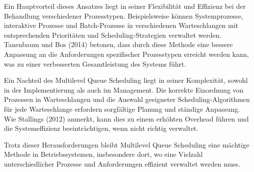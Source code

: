 Ein Hauptvorteil dieses Ansatzes liegt in seiner Flexibilität und Effizienz bei der Behandlung verschiedener Prozesstypen. Beispielsweise können Systemprozesse, interaktive Prozesse und Batch-Prozesse in verschiedenen Warteschlangen mit entsprechenden Prioritäten und Scheduling-Strategien verwaltet werden. Tanenbaum und Bos (2014) betonen, dass durch diese Methode eine bessere Anpassung an die Anforderungen spezifischer Prozesstypen erreicht werden kann, was zu einer verbesserten Gesamtleistung des Systems führt.

Ein Nachteil des Multilevel Queue Scheduling liegt in seiner Komplexität, sowohl in der Implementierung als auch im Management. Die korrekte Einordnung von Prozessen in Warteschlangen und die Auswahl geeigneter Scheduling-Algorithmen für jede Warteschlange erfordern sorgfältige Planung und ständige Anpassung. Wie Stallings (2012) anmerkt, kann dies zu einem erhöhten Overhead führen und die Systemeffizienz beeinträchtigen, wenn nicht richtig verwaltet.

Trotz dieser Herausforderungen bleibt Multilevel Queue Scheduling eine mächtige Methode in Betriebssystemen, insbesondere dort, wo eine Vielzahl unterschiedlicher Prozesse und Anforderungen effizient verwaltet werden muss.


